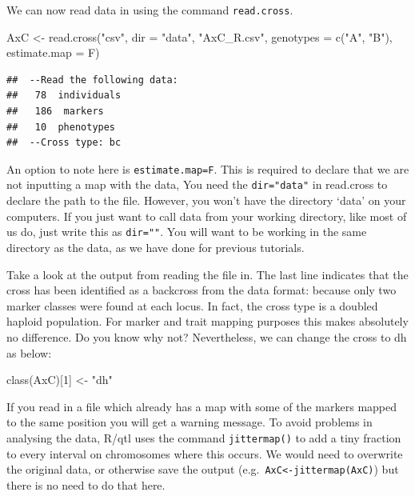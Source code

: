 \documentclass[
]{book}
\newenvironment{Shaded}{\begin{snugshade}}{\end{snugshade}}
\newcommand{\AttributeTok}[1]{\textcolor[rgb]{0.77,0.63,0.00}{#1}}
\newcommand{\DecValTok}[1]{\textcolor[rgb]{0.00,0.00,0.81}{#1}}
\newcommand{\FunctionTok}[1]{\textcolor[rgb]{0.00,0.00,0.00}{#1}}
\newcommand{\NormalTok}[1]{#1}
\newcommand{\OtherTok}[1]{\textcolor[rgb]{0.56,0.35,0.01}{#1}}
\newcommand{\StringTok}[1]{\textcolor[rgb]{0.31,0.60,0.02}{#1}}
\begin{document}
We can now read data in using the command \texttt{read.cross}.

\begin{Shaded}
\begin{Highlighting}[]
\NormalTok{AxC }\OtherTok{\textless{}{-}} \FunctionTok{read.cross}\NormalTok{(}\StringTok{"csv"}\NormalTok{, }\AttributeTok{dir =} \StringTok{"data"}\NormalTok{, }\StringTok{"AxC\_R.csv"}\NormalTok{, }\AttributeTok{genotypes =} \FunctionTok{c}\NormalTok{(}\StringTok{"A"}\NormalTok{, }
    \StringTok{"B"}\NormalTok{), }\AttributeTok{estimate.map =}\NormalTok{ F)}
\end{Highlighting}
\end{Shaded}

\begin{verbatim}
##  --Read the following data:
##   78  individuals
##   186  markers
##   10  phenotypes
##  --Cross type: bc
\end{verbatim}

An option to note here is \texttt{estimate.map=F}. This is required to declare that we are not inputting a map with the data, You need the \texttt{dir="data"} in read.cross to declare the path to the file. However, you won't have the directory `data' on your computers. If you just want to call data from your working directory, like most of us do, just write this as \texttt{dir=""}. You will want to be working in the same directory as the data, as we have done for previous tutorials.

Take a look at the output from reading the file in. The last line indicates that the cross has been identified as a backcross from the data format: because only two marker classes were found at each locus. In fact, the cross type is a doubled haploid population. For marker and trait mapping purposes this makes absolutely no difference. Do you know why not? Nevertheless, we can change the cross to dh as below:

\begin{Shaded}
\begin{Highlighting}[]
\FunctionTok{class}\NormalTok{(AxC)[}\DecValTok{1}\NormalTok{] }\OtherTok{\textless{}{-}} \StringTok{"dh"}
\end{Highlighting}
\end{Shaded}

If you read in a file which already has a map with some of the markers mapped to the same position you will get a warning message. To avoid problems in analysing the data, R/qtl uses the command \texttt{jittermap()} to add a tiny fraction to every interval on chromosomes where this occurs. We would need to overwrite the original data, or otherwise save the output (e.g.~\texttt{AxC\textless{}-jittermap(AxC)}) but there is no need to do that here.
\end{document}
